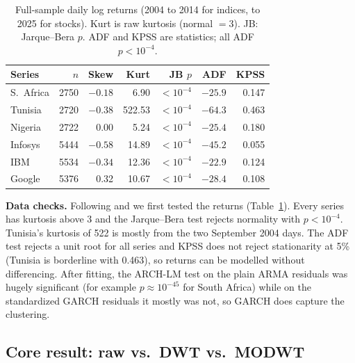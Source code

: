 \documentclass{article}
\begin{document}
\begin{table}[t]
\caption{Full-sample daily log returns (2004 to 2014 for indices, to 2025 for stocks). Kurt is raw kurtosis (normal $=3$). JB: Jarque--Bera $p$. ADF and KPSS are statistics; all ADF $p<10^{-4}$.}
\label{tab:data}
\centering\small
\setlength{\tabcolsep}{3.5pt}
\begin{tabular}{lrrrrrr}
\toprule
Series & $n$ & Skew & Kurt & JB $p$ & ADF & KPSS \\
\midrule
S.\ Africa & 2750 & $-0.18$ & 6.90 & $<10^{-4}$ & $-25.9$ & 0.147 \\
Tunisia & 2720 & $-0.38$ & 522.53 & $<10^{-4}$ & $-64.3$ & 0.463 \\
Nigeria & 2722 & 0.00 & 5.24 & $<10^{-4}$ & $-25.4$ & 0.180 \\
Infosys & 5444 & $-0.58$ & 14.89 & $<10^{-4}$ & $-45.2$ & 0.055 \\
IBM & 5534 & $-0.34$ & 12.36 & $<10^{-4}$ & $-22.9$ & 0.124 \\
Google & 5376 & 0.32 & 10.67 & $<10^{-4}$ & $-28.4$ & 0.108 \\
\bottomrule
\end{tabular}
\end{table}

\textbf{Data checks.} Following \citet{ismail2016} and \citet{rubio2023} we first tested the returns (Table~\ref{tab:data}). Every series has kurtosis above 3 and the Jarque--Bera test \cite{jarque1987} rejects normality with $p<10^{-4}$. Tunisia's kurtosis of 522 is mostly from the two September 2004 days. The ADF test \cite{dickey1979} rejects a unit root for all series and KPSS \cite{kpss1992} does not reject stationarity at 5\% (Tunisia is borderline with 0.463), so returns can be modelled without differencing. After fitting, the ARCH-LM test on the plain ARMA residuals was hugely significant (for example $p\approx10^{-45}$ for South Africa) while on the standardized GARCH residuals it mostly was not, so GARCH does capture the clustering.

\subsection{Core result: raw vs.\ DWT vs.\ MODWT}
\end{document}
